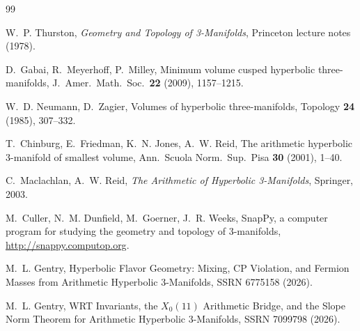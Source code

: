 \documentclass[11pt,a4paper]{article}
\theoremstyle{definition}
\begin{document}
\begin{thebibliography}{99}

W.~P. Thurston,
\emph{Geometry and Topology of 3-Manifolds},
Princeton lecture notes (1978).

D.~Gabai, R.~Meyerhoff, P.~Milley,
Minimum volume cusped hyperbolic three-manifolds,
J.\ Amer.\ Math.\ Soc.\ \textbf{22} (2009), 1157--1215.

W.~D. Neumann, D.~Zagier,
Volumes of hyperbolic three-manifolds,
Topology \textbf{24} (1985), 307--332.

T.~Chinburg, E.~Friedman, K.~N. Jones, A.~W. Reid,
The arithmetic hyperbolic 3-manifold of smallest volume,
Ann.\ Scuola Norm.\ Sup.\ Pisa \textbf{30} (2001), 1--40.

C.~Maclachlan, A.~W. Reid,
\emph{The Arithmetic of Hyperbolic 3-Manifolds},
Springer, 2003.

M.~Culler, N.~M. Dunfield, M.~Goerner, J.~R. Weeks,
SnapPy, a computer program for studying the geometry and topology
of 3-manifolds,
\url{http://snappy.computop.org}.

M.~L. Gentry,
Hyperbolic Flavor Geometry: Mixing, CP Violation, and Fermion Masses
from Arithmetic Hyperbolic 3-Manifolds,
SSRN 6775158 (2026).

M.~L. Gentry,
WRT Invariants, the $X_0(11)$ Arithmetic Bridge, and the Slope Norm
Theorem for Arithmetic Hyperbolic 3-Manifolds,
SSRN 7099798 (2026).

\end{thebibliography}
\end{document}
